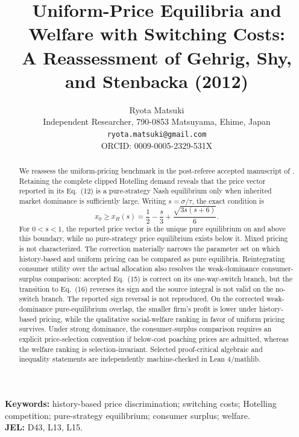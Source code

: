 \documentclass[11pt]{article}
\title{Uniform-Price Equilibria and Welfare with Switching Costs:\\
A Reassessment of Gehrig, Shy, and Stenbacka (2012)}
\author{Ryota Matsuki\\
\small Independent Researcher, 790-0853 Matsuyama, Ehime, Japan\\
\small \texttt{ryota.matsuki@gmail.com}\\
\small ORCID: 0009-0005-2329-531X}
\date{}
\theoremstyle{remark}
\newcommand{\xh}{x_H}
\begin{document}
\maketitle

\begin{abstract}
We reassess the uniform-pricing benchmark in the post-referee accepted manuscript of \citet{GehrigShyStenbacka2012}. Retaining the complete clipped Hotelling demand reveals that the price vector reported in its Eq.~(12) is a pure-strategy Nash equilibrium only when inherited market dominance is sufficiently large. Writing \(s=\sigma/\tau\), the exact condition is
\[
x_0\ge \xh(s)
=\frac12-\frac{s}{3}
+\frac{\sqrt{3s(s+6)}}6.
\]
For \(0<s<1\), the reported price vector is the unique pure equilibrium on and above this boundary, while no pure-strategy price equilibrium exists below it. Mixed pricing is not characterized. The correction materially narrows the parameter set on which history-based and uniform pricing can be compared as pure equilibria. Reintegrating consumer utility over the actual allocation also resolves the weak-dominance consumer-surplus comparison: accepted Eq.~(15) is correct on its one-way-switch branch, but the transition to Eq.~(16) reverses its sign and the source integral is not valid on the no-switch branch. The reported sign reversal is not reproduced. On the corrected weak-dominance pure-equilibrium overlap, the smaller firm's profit is lower under history-based pricing, while the qualitative social-welfare ranking in favor of uniform pricing survives. Under strong dominance, the consumer-surplus comparison requires an explicit price-selection convention if below-cost poaching prices are admitted, whereas the welfare ranking is selection-invariant. Selected proof-critical algebraic and inequality statements are independently machine-checked in Lean 4/mathlib.
\end{abstract}

\begingroup\small
\noindent\textbf{Keywords:} history-based price discrimination; switching costs; Hotelling competition; pure-strategy equilibrium; consumer surplus; welfare.\\
\textbf{JEL:} D43, L13, L15.
\endgroup











\appendix







\end{document}
